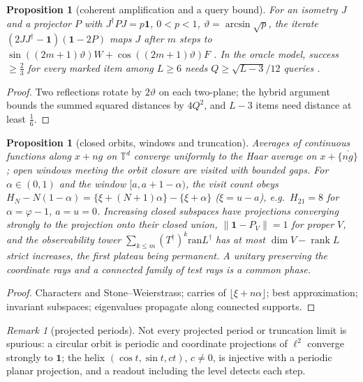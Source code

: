 \documentclass[aps,pra,onecolumn,superscriptaddress,nofootinbib,10pt]{revtex4-2}
\newtheorem{proposition}[theorem]{Proposition}
\theoremstyle{definition}
\theoremstyle{remark}
\newtheorem{remark}[theorem]{Remark}
\newcommand{\rk}{\operatorname{rank}}
\begin{document}
\begin{proposition}[coherent amplification and a query bound]\label{prop:bdamplify}
For an isometry $J$ and a projector $P$ with $J^\dagger PJ=p\mathbf1$, $0<p<1$, $\vartheta=\arcsin\sqrt p$, the iterate $(2JJ^\dagger-\mathbf1)(\mathbf1-2P)$ maps $J$ after $m$ steps to
$\sin((2m+1)\vartheta)W+\cos((2m+1)\vartheta)F$ \cite{ex-Grover97,n4:BHMT}.  In the oracle model, success $\ge\tfrac23$ for every marked item among $L\ge6$ needs
$Q\ge\sqrt{L-3}/12$ queries \cite{n4:BBBV}.
\end{proposition}
\begin{proof}
Two reflections rotate by $2\vartheta$ on each two-plane; the hybrid argument bounds the summed squared distances by $4Q^2$, and $L-3$
items need distance at least $\tfrac16$.
\end{proof}

\begin{proposition}[closed orbits, windows and truncation]\label{prop:bdtorus}
Averages of continuous functions along $x+ng$ on $\mathbb T^d$ converge uniformly to the Haar average on $x+\overline{\{ng\}}$ \cite{n4:Weyl}; open windows
meeting the orbit closure are visited with bounded gaps.  For $\alpha\in(0,1)$ and the window $[a,a+1-\alpha)$, the visit count obeys
$H_N-N(1-\alpha)=\{\xi+(N+1)\alpha\}-\{\xi+\alpha\}$ ($\xi=u-a$), e.g.\ $H_{21}=8$ for $\alpha=\varphi-1$, $a=u=0$.  Increasing closed subspaces have projections converging
strongly to the projection onto their closed union, $\lVert\mathbf1-P_V\rVert=1$ for proper $V$, and the observability tower $\sum_{k\le m}(T^\dagger)^k\mathrm{ran}L^\dagger$
has at most $\dim V-\rk L$ strict increases, the first plateau being permanent.  A unitary preserving the coordinate
rays and a connected family of test rays is a common phase.
\end{proposition}
\begin{proof}
Characters and Stone--Weierstrass; carries of $\lfloor\xi+n\alpha\rfloor$; best approximation; invariant subspaces; eigenvalues propagate along
connected supports.
\end{proof}
\begin{remark}[projected periods]\label{rem:bdhelix}
Not every projected period or truncation limit is spurious: a circular orbit is periodic and coordinate
projections of $\ell^2$ converge strongly to $\mathbf1$; the helix $(\cos t,\sin t,ct)$, $c\ne0$, is injective with a periodic planar projection,
and a readout including the level detects each step.
\end{remark}
\end{document}
